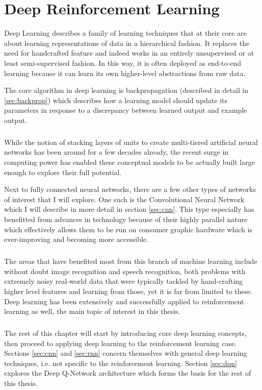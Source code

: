 \chapter{Deep Reinforcement Learning}
Deep Learning describes a family of learning techniques
that at their core are about learning representations of data
in a hierarchical fashion.
It replaces the need for handcrafted feature
and indeed works in an entirely unsupervised or at least
semi-supervised fashion.
In this way,
it is often deployed as end-to-end learning
because it can learn its own higher-level abstractions
from raw data.

The core algorithm in deep learning is backpropagation
(described in detail in \ref{sec:backprop})
which describes how a learning model should update its parameters
in response to a discrepancy between learned output
and example output.

\paragraph{}
While the notion of stacking layers of units
to create multi-tiered artificial neural networks
has been around for a few decades already,
the recent surge in computing power
has enabled these conceptual models
to be actually built large enough
to explore their full potential.

Next to fully connected neural networks,
there are a few other types of networks of interest
that I will explore.
One such is the Convolutional Neural Network
which I will describe in more detail in
section \ref{sec:cnn}.
This type especially has benefitted from
advances in technology because of their highly
parallel nature which effectively allows them to be run
on consumer graphic hardware which is ever-improving
and becoming more accessible.

\paragraph{}
The areas that have benefited most from
this branch of machine learning
include without doubt
image recognition and speech recognition,
both problems with extremely noisy real-world data
that were typically tackled
by hand-crafting higher level features
and learning from those,
yet it is far from limited to these.
Deep learning has been extensively and successfully
applied to reinforcement learning as well,
the main topic of interest in this thesis.

\paragraph{}
The rest of this chapter will start by introducing
core deep learning concepts,
then proceed to applying deep learning
to the reinforcement learning case.
Sections \ref{sec:cnn} and \ref{sec:rnn}
concern themselves with general deep learning techniques,
i.e. not specific to the reinforcement learning.
Section \ref{sec:dqn}
explores the Deep Q-Network architecture
which forms the basis for the rest of this thesis.

